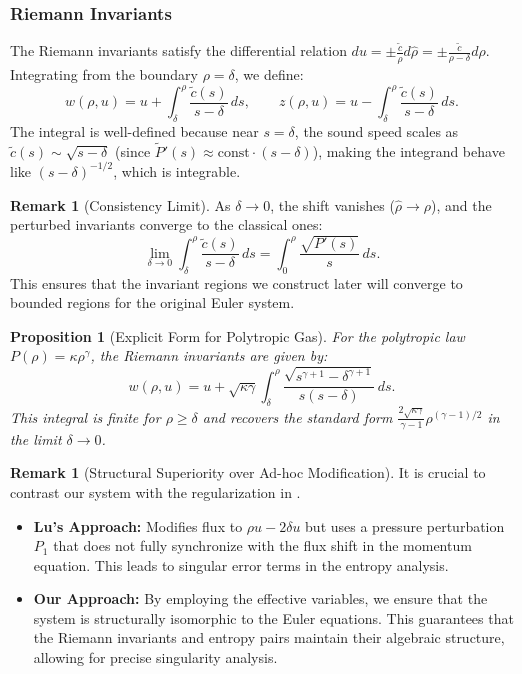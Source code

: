 \documentclass[12pt, reqno]{article}
\newtheorem{proposition}[theorem]{Proposition}
\theoremstyle{definition}
\newtheorem{remark}[theorem]{Remark}
\numberwithin{equation}{section}
\begin{document}
\subsubsection*{Riemann Invariants}
The Riemann invariants satisfy the differential relation $du = \pm \frac{\tilde{c}}{\hat{\rho}} d\hat{\rho} = \pm \frac{\tilde{c}}{\rho-\delta} d\rho$. Integrating from the boundary $\rho=\delta$, we define:
\begin{equation} \label{eq:riemann_invariants}
    w(\rho,u) = u + \int_{\delta}^{\rho} \frac{\tilde{c}(s)}{s-\delta} \, ds,\qquad
    z(\rho,u) = u - \int_{\delta}^{\rho} \frac{\tilde{c}(s)}{s-\delta} \, ds.
\end{equation}
The integral is well-defined because near $s=\delta$, the sound speed scales as $\tilde{c}(s)\sim\sqrt{s-\delta}$ (since $\tilde{P}'(s) \approx \text{const} \cdot (s-\delta)$), making the integrand behave like $(s-\delta)^{-1/2}$, which is integrable.

\begin{remark}[Consistency Limit]
\label{rem:consistency}
As $\delta \to 0$, the shift vanishes ($\hat{\rho} \to \rho$), and the perturbed invariants converge to the classical ones:
\[
\lim_{\delta \to 0} \int_{\delta}^{\rho} \frac{\tilde{c}(s)}{s-\delta} \, ds = \int_{0}^{\rho} \frac{\sqrt{P'(s)}}{s} \, ds.
\]
This ensures that the invariant regions we construct later will converge to bounded regions for the original Euler system.
\end{remark}

\begin{proposition}[Explicit Form for Polytropic Gas]
For the polytropic law $P(\rho) = \kappa\rho^\gamma$, the Riemann invariants are given by:
\begin{equation}\label{eq:riemann_explicit_corrected}
    w(\rho,u) = u + \sqrt{\kappa\gamma} \int_{\delta}^{\rho} \frac{\sqrt{s^{\gamma+1} - \delta^{\gamma+1}}}{s(s-\delta)} \, ds.
\end{equation}
This integral is finite for $\rho \ge \delta$ and recovers the standard form $\frac{2\sqrt{\kappa\gamma}}{\gamma-1}\rho^{(\gamma-1)/2}$ in the limit $\delta \to 0$.
\end{proposition}

\begin{remark}[Structural Superiority over Ad-hoc Modification]
It is crucial to contrast our system with the regularization in \cite{Lu2007}.
\begin{itemize}
    \item \textbf{Lu's Approach:} Modifies flux to $\rho u - 2\delta u$ but uses a pressure perturbation $P_1$ that does not fully synchronize with the flux shift in the momentum equation. This leads to singular error terms in the entropy analysis.
    \item \textbf{Our Approach:} By employing the effective variables, we ensure that the system is structurally isomorphic to the Euler equations. This guarantees that the Riemann invariants and entropy pairs maintain their algebraic structure, allowing for precise singularity analysis.
\end{itemize}
\end{remark}
\end{document}

